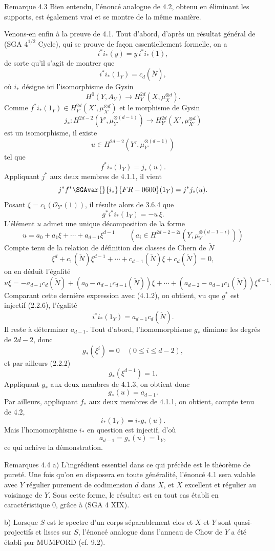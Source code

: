 \begin{statement}{Remarque 4.3}
Bien entendu, l'énoncé analogue de 4.2, obtenu en éliminant les supports, est également vrai et se montre de la même manière.
\end{statement}

Venons-en enfin à la preuve de 4.1. Tout d'abord, d'après un résultat général de (SGA $4^{1/2}$ Cycle), qui se prouve de façon essentiellement formelle, on a
\[
i^*i_*(y)=y\,i^*i_*(1),
\]
de sorte qu'il s'agit de montrer que
\[
i^*i_*(1_Y)=c_d(\check N),
\]
où $i_*$ désigne ici l'isomorphisme de Gysin
\[
H^0(Y,A_Y)\to H_Y^{2d}(X,\mu_X^{\otimes d}).
\]
Comme $f^*i_*(1_Y)\in H_{Y'}^{2d}(X',\mu_{X'}^{\otimes d})$ et le morphisme de Gysin
\[
j_*:H^{2d-2}(Y',\mu_{Y'}^{\otimes(d-1)})
\to H_{Y'}^{2d}(X',\mu_{X'}^{\otimes d})
\]
est un isomorphisme, il existe
\[
u\in H^{2d-2}(Y',\mu_{Y'}^{\otimes(d-1)})
\]
tel que
\[
f^*i_*(1_Y)=j_*(u).
\tag{4.1.1}
\]
Appliquant $j^*$ aux deux membres de 4.1.1, il vient
\[
j^*f^*\SGAvar{}{i_*}{FR-0600}(1_Y)=j^*j_*(u).
\]
Posant $\xi=c_1(\mathcal{O}_{Y'}(1))$, il résulte alors de 3.6.4 que
\[
g^*i^*i_*(1_Y)=-u\,\xi.
\tag{4.1.2}
\]
L'élément $u$ admet une unique décomposition de la forme
\[
u=a_0+a_1\xi+\cdots+a_{d-1}\xi^{d-1}
\qquad
(a_i\in H^{2d-2-2i}(Y,\mu_Y^{\otimes(d-1-i)}))
\tag{4.1.3}
\]
Compte tenu de la relation de définition des classes de Chern de $\check N$
\[
\xi^d+c_1(\check N)\xi^{d-1}+\cdots+c_{d-1}(\check N)\xi+c_d(\check N)=0,
\tag{4.1.4}
\]
on en déduit l'égalité
\[
u\xi=-a_{d-1}c_d(\check N)+(a_0-a_{d-1}c_{d-1}(\check N))\xi
+\cdots+(a_{d-2}-a_{d-1}c_1(\check N))\xi^{d-1}.
\]
Comparant cette dernière expression avec (4.1.2), on obtient, vu que $g^*$ est injectif (2.2.6), l'égalité
\[
i^*i_*(1_Y)=a_{d-1}c_d(\check N).
\tag{4.1.5}
\]
Il reste à déterminer $a_{d-1}$. Tout d'abord, l'homomorphisme $g_*$ diminue les degrés de $2d-2$, donc
\[
g_*(\xi^i)=0\quad(0\le i\le d-2),
\]
et par ailleurs (2.2.2)
\[
g_*(\xi^{d-1})=1.
\]
Appliquant $g_*$ aux deux membres de 4.1.3, on obtient donc
\[
g_*(u)=a_{d-1}.
\tag{4.1.6}
\]
Par ailleurs, appliquant $f_*$ aux deux membres de 4.1.1, on obtient, compte tenu de 4.2,
\[
i_*(1_Y)=i_*g_*(u).
\tag{4.1.7}
\]
Mais l'homomorphisme $i_*$ en question est injectif, d'où
\[
a_{d-1}=g_*(u)=1_Y,
\]
ce qui achève la démonstration.

\begin{statement}{Remarques 4.4}
a) L'ingrédient essentiel dans ce qui précède est le théorème de pureté. Une fois qu'on en disposera en toute généralité, l'énoncé 4.1 sera valable avec $Y$ régulier purement de codimension $d$ dans $X$, et $X$ excellent et régulier au voisinage de $Y$. Sous cette forme, le résultat est en tout cas établi en caractéristique $0$, grâce à (SGA 4 XIX).

b) Lorsque $S$ est le spectre d'un corps séparablement clos et $X$ et $Y$
sont quasi-projectifs et lisses sur $S$, l'énoncé analogue dans l'anneau de Chow de $Y$ a été établi par MUMFORD (cf. 9.2).
\end{statement}

